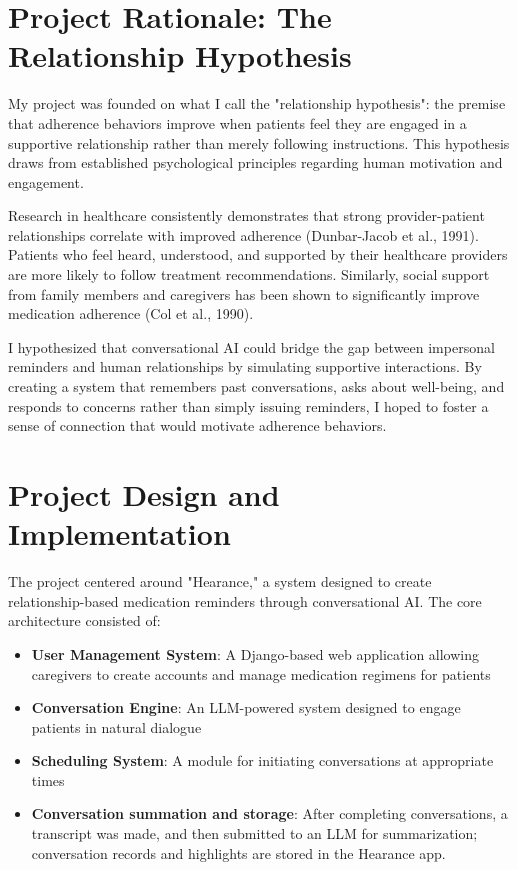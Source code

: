 \documentclass[sigconf]{acmart}
\begin{document}
\section{Project Rationale: The Relationship Hypothesis}

My project was founded on what I call the "relationship hypothesis": the premise that adherence behaviors improve when patients feel they are engaged in a supportive relationship rather than merely following instructions. This hypothesis draws from established psychological principles regarding human motivation and engagement.

Research in healthcare consistently demonstrates that strong provider-patient relationships correlate with improved adherence (Dunbar-Jacob et al., 1991)\cite{DunbarJacob1991}. Patients who feel heard, understood, and supported by their healthcare providers are more likely to follow treatment recommendations. Similarly, social support from family members and caregivers has been shown to significantly improve medication adherence (Col et al., 1990)\cite{Col1990}.

I hypothesized that conversational AI could bridge the gap between impersonal reminders and human relationships by simulating supportive interactions. By creating a system that remembers past conversations, asks about well-being, and responds to concerns rather than simply issuing reminders, I hoped to foster a sense of connection that would motivate adherence behaviors.

\section{Project Design and Implementation}
The project centered around "Hearance," a system designed to create relationship-based medication reminders through conversational AI. The core architecture consisted of:

\begin{itemize}

  \item \textbf{User Management System}: A Django-based web application allowing caregivers to create accounts and manage medication regimens for patients
  \item \textbf{Conversation Engine}: An LLM-powered system designed to engage patients in natural dialogue
  \item \textbf{Scheduling System}: A module for initiating conversations at appropriate times
  \item \textbf{Conversation summation and storage}: After completing conversations, a transcript was made, and then submitted to an LLM for summarization; conversation records and highlights are stored in the Hearance app.
\end{itemize}
\end{document}

